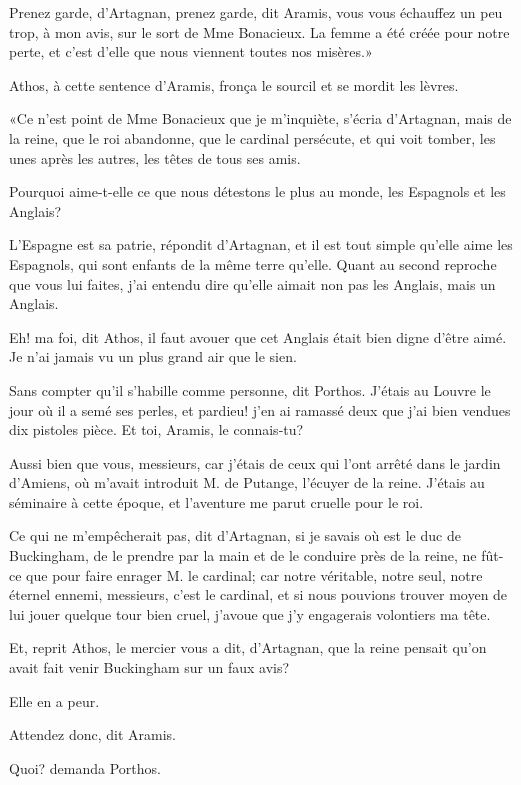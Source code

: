 \speak  Prenez garde, d'Artagnan, prenez garde, dit Aramis, vous vous échauffez un peu trop, à mon avis, sur le sort de Mme Bonacieux. La femme a été créée pour notre perte, et c'est d'elle que nous viennent toutes nos misères.» 

Athos, à cette sentence d'Aramis, fronça le sourcil et se mordit les lèvres. 

«Ce n'est point de Mme Bonacieux que je m'inquiète, s'écria d'Artagnan, mais de la reine, que le roi abandonne, que le cardinal persécute, et qui voit tomber, les unes après les autres, les têtes de tous ses amis. 

\speak  Pourquoi aime-t-elle ce que nous détestons le plus au monde, les Espagnols et les Anglais? 

\speak  L'Espagne est sa patrie, répondit d'Artagnan, et il est tout simple qu'elle aime les Espagnols, qui sont enfants de la même terre qu'elle. Quant au second reproche que vous lui faites, j'ai entendu dire qu'elle aimait non pas les Anglais, mais un Anglais. 

\speak  Eh! ma foi, dit Athos, il faut avouer que cet Anglais était bien digne d'être aimé. Je n'ai jamais vu un plus grand air que le sien. 

\speak  Sans compter qu'il s'habille comme personne, dit Porthos. J'étais au Louvre le jour où il a semé ses perles, et pardieu! j'en ai ramassé deux que j'ai bien vendues dix pistoles pièce. Et toi, Aramis, le connais-tu? 

\speak  Aussi bien que vous, messieurs, car j'étais de ceux qui l'ont arrêté dans le jardin d'Amiens, où m'avait introduit M. de Putange, l'écuyer de la reine. J'étais au séminaire à cette époque, et l'aventure me parut cruelle pour le roi. 

\speak  Ce qui ne m'empêcherait pas, dit d'Artagnan, si je savais où est le duc de Buckingham, de le prendre par la main et de le conduire près de la reine, ne fût-ce que pour faire enrager M. le cardinal; car notre véritable, notre seul, notre éternel ennemi, messieurs, c'est le cardinal, et si nous pouvions trouver moyen de lui jouer quelque tour bien cruel, j'avoue que j'y engagerais volontiers ma tête. 

\speak  Et, reprit Athos, le mercier vous a dit, d'Artagnan, que la reine pensait qu'on avait fait venir Buckingham sur un faux avis? 

\speak  Elle en a peur. 

\speak  Attendez donc, dit Aramis. 

\speak  Quoi? demanda Porthos. 

